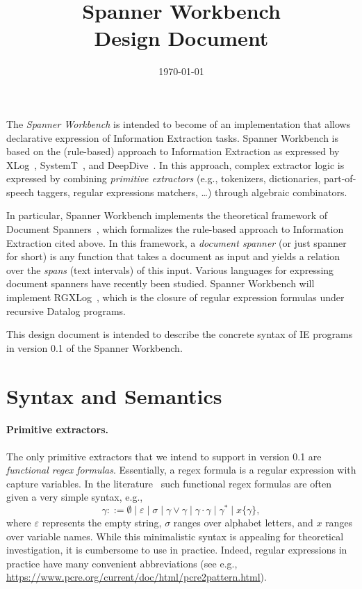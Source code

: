 \documentclass[a4paper,11pt,pdftex]{article}
\newcommand{\implname}{Spanner Workbench\xspace}
\newcommand{\ie}{IE\xspace}
\begin{document}
\title{\implname\\Design Document}
\date{\today}

\maketitle

The \emph{\implname} is intended to become of an implementation that allows
declarative expression of Information Extraction tasks. \implname is based on
the (rule-based) approach to Information Extraction as expressed by
XLog~\cite{SDNR07}, SystemT~\cite{CKLRRV10}, and DeepDive~\cite{DBLP:journals/cacm/ZhangRCSWW17}. In this approach, complex extractor logic is expressed by combining \emph{primitive extractors} (e.g., tokenizers, dictionaries, part-of-speech taggers, regular expressions matchers, \dots) through algebraic combinators.

In particular, \implname implements the theoretical framework of Document
Spanners~\cite{FaginKRV15}, which formalizes the rule-based approach to Information
Extraction cited above. In this framework, a \emph{document spanner} (or just
spanner for short) is any function that takes a document as input and yields a
relation over the \emph{spans} (text intervals) of this input.  Various
languages for expressing document spanners have recently been studied. \implname
will implement \textsf{RGXLog}~\cite{DBLP:conf/icdt/PeterfreundCFK19}, which is the closure of  regular expression formulas under recursive Datalog programs.

This design document is intended to describe the concrete syntax of \ie programs in version 0.1 of the \implname. 

\section{Syntax and Semantics}
\label{sec:syntax}

\paragraph*{Primitive extractors.} The only primitive extractors that we intend to support in version 0.1 are \emph{functional regex formulas}. Essentially, a regex formula is a regular expression with capture variables. In the literature~\cite{FaginKRV15} such functional regex formulas are often given a very simple syntax, e.g.,
\[ \gamma ::= \emptyset \mid \varepsilon \mid \sigma \mid \gamma \vee \gamma \mid \gamma \cdot \gamma \mid \gamma^* \mid x\{\gamma\},\]
where $\varepsilon$ represents the empty string, $\sigma$ ranges over alphabet letters, and $x$ ranges over variable names.
While this minimalistic syntax is appealing for theoretical investigation, it is
cumbersome to use in practice. Indeed, regular expressions in practice have many
convenient abbreviations (see e.g.,
\url{https://www.pcre.org/current/doc/html/pcre2pattern.html}).
\end{document}
